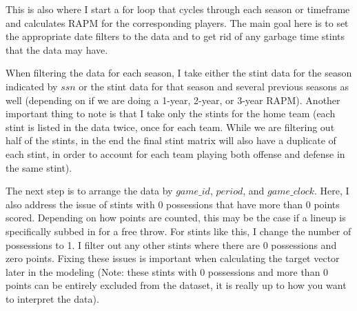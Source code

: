 \documentclass[]{article}
\newenvironment{Shaded}{\begin{snugshade}}{\end{snugshade}}
\newcommand{\KeywordTok}[1]{\textcolor[rgb]{0.13,0.29,0.53}{\textbf{#1}}}
\newcommand{\DecValTok}[1]{\textcolor[rgb]{0.00,0.00,0.81}{#1}}
\newcommand{\StringTok}[1]{\textcolor[rgb]{0.31,0.60,0.02}{#1}}
\newcommand{\OperatorTok}[1]{\textcolor[rgb]{0.81,0.36,0.00}{\textbf{#1}}}
\newcommand{\NormalTok}[1]{#1}
\begin{document}
\begin{Shaded}
\end{Shaded}

This is also where I start a for loop that cycles through each season or
timeframe and calculates RAPM for the corresponding players. The main
goal here is to set the appropriate date filters to the data and to get
rid of any garbage time stints that the data may have.

When filtering the data for each season, I take either the stint data
for the season indicated by \(ssn\) or the stint data for that season
and several previous seasons as well (depending on if we are doing a
1-year, 2-year, or 3-year RAPM). Another important thing to note is that
I take only the stints for the home team (each stint is listed in the
data twice, once for each team. While we are filtering out half of the
stints, in the end the final stint matrix will also have a duplicate of
each stint, in order to account for each team playing both offense and
defense in the same stint).

The next step is to arrange the data by \(game\_id\), \(period\), and
\(game\_clock\). Here, I also address the issue of stints with 0
possessions that have more than 0 points scored. Depending on how points
are counted, this may be the case if a lineup is specifically subbed in
for a free throw. For stints like this, I change the number of
possessions to 1. I filter out any other stints where there are 0
possessions and zero points. Fixing these issues is important when
calculating the target vector later in the modeling (Note: these stints
with 0 possessions and more than 0 points can be entirely excluded from
the dataset, it is really up to how you want to interpret the data).
\end{document}
